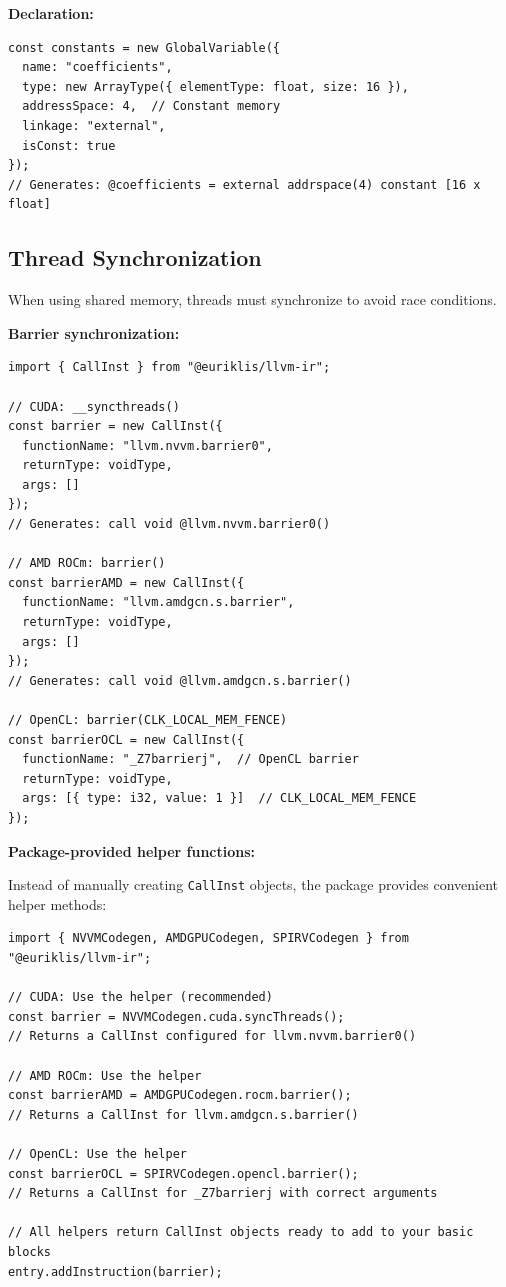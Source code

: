 \documentclass[11pt]{article}
\begin{document}
\textbf{Declaration:}
\begin{lstlisting}[style=ts]
const constants = new GlobalVariable({
  name: "coefficients",
  type: new ArrayType({ elementType: float, size: 16 }),
  addressSpace: 4,  // Constant memory
  linkage: "external",
  isConst: true
});
// Generates: @coefficients = external addrspace(4) constant [16 x float]
\end{lstlisting}

\subsection{Thread Synchronization}

When using shared memory, threads must synchronize to avoid race conditions.

\textbf{Barrier synchronization:}
\begin{lstlisting}[style=ts]
import { CallInst } from "@euriklis/llvm-ir";

// CUDA: __syncthreads()
const barrier = new CallInst({
  functionName: "llvm.nvvm.barrier0",
  returnType: voidType,
  args: []
});
// Generates: call void @llvm.nvvm.barrier0()

// AMD ROCm: barrier()
const barrierAMD = new CallInst({
  functionName: "llvm.amdgcn.s.barrier",
  returnType: voidType,
  args: []
});
// Generates: call void @llvm.amdgcn.s.barrier()

// OpenCL: barrier(CLK_LOCAL_MEM_FENCE)
const barrierOCL = new CallInst({
  functionName: "_Z7barrierj",  // OpenCL barrier
  returnType: voidType,
  args: [{ type: i32, value: 1 }]  // CLK_LOCAL_MEM_FENCE
});
\end{lstlisting}

\textbf{Package-provided helper functions:}

Instead of manually creating \texttt{CallInst} objects, the package provides convenient helper methods:

\begin{lstlisting}[style=ts]
import { NVVMCodegen, AMDGPUCodegen, SPIRVCodegen } from "@euriklis/llvm-ir";

// CUDA: Use the helper (recommended)
const barrier = NVVMCodegen.cuda.syncThreads();
// Returns a CallInst configured for llvm.nvvm.barrier0()

// AMD ROCm: Use the helper
const barrierAMD = AMDGPUCodegen.rocm.barrier();
// Returns a CallInst for llvm.amdgcn.s.barrier()

// OpenCL: Use the helper
const barrierOCL = SPIRVCodegen.opencl.barrier();
// Returns a CallInst for _Z7barrierj with correct arguments

// All helpers return CallInst objects ready to add to your basic blocks
entry.addInstruction(barrier);
\end{lstlisting}
\end{document}

